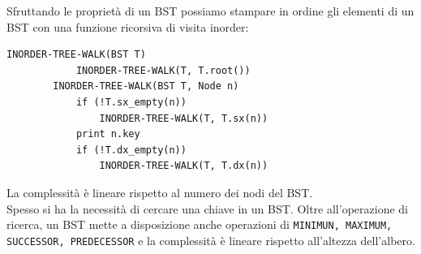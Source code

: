 \documentclass[12pt]{report}
\begin{document}
  	Sfruttando le proprietà di un BST possiamo stampare in ordine gli elementi di un BST con una funzione ricorsiva di visita inorder:
  	\begin{lstlisting}[style=pascalstyle]
  		INORDER-TREE-WALK(BST T)
  			INORDER-TREE-WALK(T, T.root())
  		INORDER-TREE-WALK(BST T, Node n)
  			if (!T.sx_empty(n))
  				INORDER-TREE-WALK(T, T.sx(n))
  			print n.key
  			if (!T.dx_empty(n))
  				INORDER-TREE-WALK(T, T.dx(n))
  	\end{lstlisting}
  	La complessità è lineare rispetto al numero dei nodi del BST.  \\
  	Spesso si ha la necessità di cercare una chiave in un BST. Oltre all'operazione di ricerca, un BST mette a disposizione anche operazioni di \texttt{MINIMUN, MAXIMUM, SUCCESSOR, PREDECESSOR} e la complessità è lineare rispetto all'altezza dell'albero.
\end{document}
